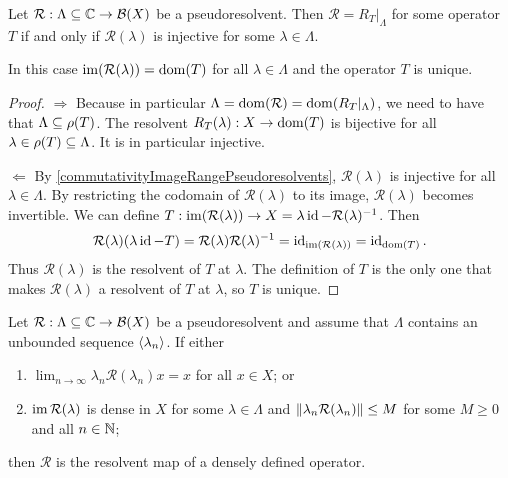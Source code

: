 \begin{proposition}
Let $\mathcal{R}:\Lambda \subseteq \mathbb{C} \to \operatorname{\mathcal{B}}(X)$ be a pseudoresolvent. Then $\mathcal{R} = R_T|_\Lambda$ for some operator $T$ \textup{if and only if} $\mathcal{R}(\lambda)$ is injective for some $\lambda\in\Lambda$.

In this case $\operatorname{im}(\mathcal{R}(\lambda)) = \operatorname{dom}(T)$ for all $\lambda\in \Lambda$ and the operator $T$ is unique.
\end{proposition}
\begin{proof}
$\boxed{\Rightarrow}$ Because in particular $\Lambda = \operatorname{dom}(\mathcal{R}) = \operatorname{dom}(R_T|_\Lambda)$, we need to have that $\Lambda \subseteq \rho(T)$. The resolvent $R_T(\lambda): X\to \operatorname{dom}(T)$ is bijective for all $\lambda\in \rho(T)\subseteq \Lambda$. It is in particular injective.

$\boxed{\Leftarrow}$ By \ref{commutativityImageRangePseudoresolvents}, $\mathcal{R}(\lambda)$ is injective for all $\lambda\in\Lambda$. By restricting the codomain of $\mathcal{R}(\lambda)$ to its image, $\mathcal{R}(\lambda)$ becomes invertible. We can define $T: \operatorname{im}(\mathcal{R}(\lambda)) \to X = \lambda\operatorname{id} - \mathcal{R}(\lambda)^{-1}$. Then
\[ \mathcal{R}(\lambda)(\lambda\operatorname{id} - T) = \mathcal{R}(\lambda)\mathcal{R}(\lambda)^{-1} = \operatorname{id}_{\operatorname{im}(\mathcal{R}(\lambda))} = \operatorname{id}_{\operatorname{dom}(T)}. \]
Thus $\mathcal{R}(\lambda)$ is the resolvent of $T$ at $\lambda$.
The definition of $T$ is the only one that makes $\mathcal{R}(\lambda)$ a resolvent of $T$ at $\lambda$, so $T$ is unique.
\end{proof}
\begin{corollary}
Let $\mathcal{R}:\Lambda \subseteq \mathbb{C} \to \operatorname{\mathcal{B}}(X)$ be a pseudoresolvent and assume that $\Lambda$ contains an unbounded sequence $\left\langle \lambda_n \right\rangle$. If either
\begin{enumerate}
\item $\lim_{n\to\infty}\lambda_n\mathcal{R}(\lambda_n)x = x$ for all $x\in X$; or
\item $\operatorname{im}\mathcal{R}(\lambda)$ is dense in $X$ for some $\lambda\in \Lambda$ and $\lVert\lambda_n \mathcal{R}(\lambda_n)\rVert \leq M$ for some $M\geq 0$ and all $n\in\mathbb{N}$;
\end{enumerate}
then $\mathcal{R}$ is the resolvent map of a densely defined operator.
\end{corollary}
